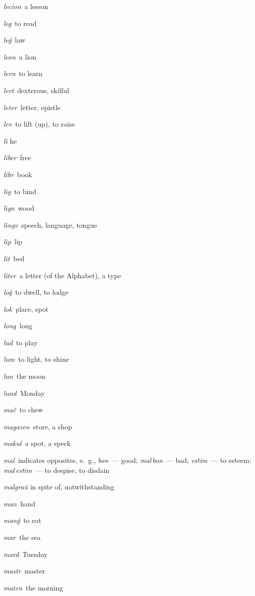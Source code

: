 \begin{landscape}
\begin{multicols}{5}
\begin{outdent}{1em}
\emph{lecion\,} a lesson

\emph{leg\,} to read

\emph{leĝ\,} law

\emph{leon\,} a lion

\emph{lern\,} to learn

\emph{lert\,} dexterous, skilful

\emph{leter\,} letter, epistle

\emph{lev\,} to lift (up), to raise

\emph{li} he

\emph{liber\,} free

\emph{libr\,} book

\emph{lig\,} to bind

\emph{lign\,} wood

\emph{lingv\,} speech, language, tongue

\emph{lip\,} lip

\emph{lit\,} bed

\emph{liter\,} a letter (of the Alphabet), a type

\emph{loĝ\,} to dwell, to lodge

\emph{lok\,} place, spot

\emph{long\,} long

\emph{lud\,} to play

\emph{lum\,} to light, to shine

\emph{lun\,} the moon

\emph{lund\,} Monday
\end{outdent}


\begin{outdent}{1em}
\emph{maĉ\,} to chew

\emph{magazen\,} store, a shop

\emph{makul\,} a spot, a speck

\emph{mal\,} indicates opposites, e.~g., \emph{bon\,} — good; \emph{mal\,bon\,} — bad; \emph{estim\,} — to esteem; \emph{mal\,estim\,} — to despise, to disdain

\emph{malgraŭ} in spite of, notwithstanding

\emph{man\,} hand

\emph{manĝ\,} to eat

\emph{mar\,} the sea

\emph{mard\,} Tuesday

\emph{mastr\,} master

\emph{maten\,} the morning


\end{outdent}
\end{multicols}
\end{landscape}
